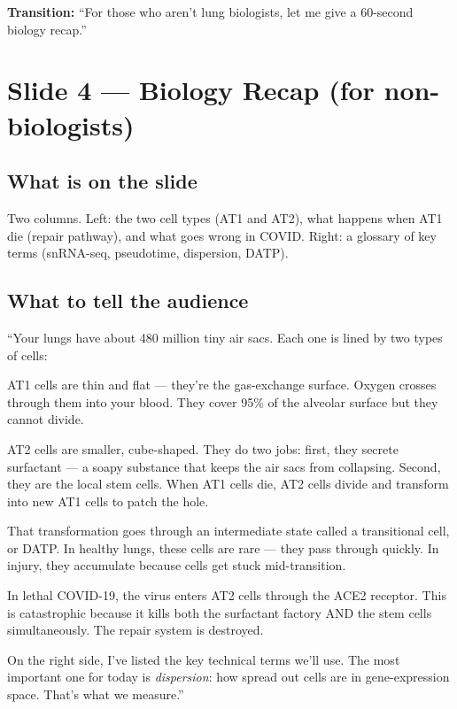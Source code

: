 \documentclass[11pt]{article}
\begin{document}
\textbf{Transition:} ``For those who aren't lung biologists, let me give a 60-second biology recap.''


\section{Slide 4 --- Biology Recap (for non-biologists)}

\subsection{What is on the slide}

Two columns. Left: the two cell types (AT1 and AT2), what happens when AT1 die (repair pathway), and what goes wrong in COVID. Right: a glossary of key terms (snRNA-seq, pseudotime, dispersion, DATP).

\subsection{What to tell the audience}

\begin{speaknote}
``Your lungs have about 480 million tiny air sacs. Each one is lined by two types of cells:

AT1 cells are thin and flat --- they're the gas-exchange surface. Oxygen crosses through them into your blood. They cover 95\% of the alveolar surface but they cannot divide.

AT2 cells are smaller, cube-shaped. They do two jobs: first, they secrete surfactant --- a soapy substance that keeps the air sacs from collapsing. Second, they are the local stem cells. When AT1 cells die, AT2 cells divide and transform into new AT1 cells to patch the hole.

That transformation goes through an intermediate state called a transitional cell, or DATP. In healthy lungs, these cells are rare --- they pass through quickly. In injury, they accumulate because cells get stuck mid-transition.

In lethal COVID-19, the virus enters AT2 cells through the ACE2 receptor. This is catastrophic because it kills both the surfactant factory AND the stem cells simultaneously. The repair system is destroyed.

On the right side, I've listed the key technical terms we'll use. The most important one for today is \emph{dispersion}: how spread out cells are in gene-expression space. That's what we measure.''
\end{speaknote}
\end{document}
